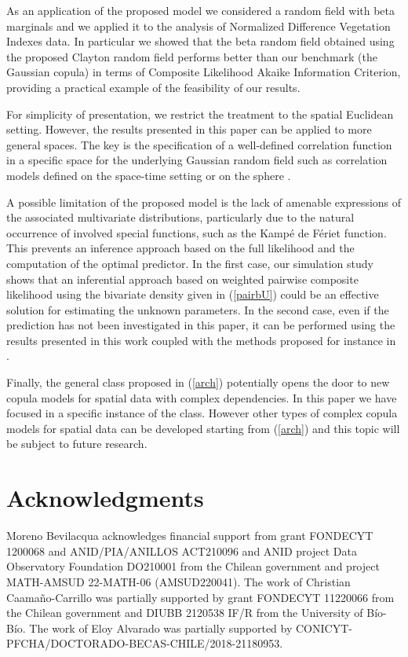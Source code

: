 \documentclass[times,sort&compress,3p]{elsarticle}
\theoremstyle{plain}%
\theoremstyle{definition}
\begin{document}
As an application of the proposed model we considered a random field with beta  marginals
and we applied it to the analysis of  Normalized Difference Vegetation Indexes data.
In  particular we showed that the
beta random field obtained using the proposed
Clayton random field performs better than our benchmark (the Gaussian copula) in terms of Composite Likelihood Akaike Information Criterion, providing a practical example of the feasibility of our results.

For simplicity of presentation, we restrict the treatment to the spatial Euclidean setting.
However, the results presented in this paper can be applied to more general spaces. The key is the specification of a well-defined correlation function in a specific space for the underlying Gaussian random field such as correlation models defined on the space-time setting or on the sphere \citep{gneiting2013,porcubev}.


A possible limitation of the proposed model is the lack of amenable expressions of the associated multivariate distributions, particularly due to the natural occurrence of  involved special functions, such as the Kampé de Fériet function. This prevents an inference approach based on the full likelihood and the computation of the optimal predictor. In the first case, our simulation study shows that an inferential approach based on weighted pairwise composite likelihood using the bivariate density given in (\ref{pairbU}) could be an effective solution for estimating the unknown parameters.
In the second case,
even if the prediction has not been investigated in this paper,
it  can be performed using the results presented in this work coupled with the methods proposed for instance in \cite{Kazianka2010}.

Finally, the general class proposed in  (\ref{arch}) potentially opens the door to
new copula models for spatial data with complex dependencies. In this paper we have focused in a specific instance  of the class. However other types of complex copula models  for spatial data can be developed starting from   (\ref{arch})
and this topic will be subject to future research.








\section*{Acknowledgments}
Moreno Bevilacqua acknowledges financial support from grant FONDECYT 1200068 and ANID/PIA/ANILLOS ACT210096
and  ANID project Data Observatory Foundation DO210001 from the Chilean government
and project MATH-AMSUD 22-MATH-06 (AMSUD220041). The work of Christian Caama\~no-Carrillo was partially supported by grant FONDECYT 11220066 from the Chilean government and DIUBB 2120538 IF/R from the University of B\'io-B\'io.  The work of Eloy Alvarado was partially supported by CONICYT-PFCHA/DOCTORADO-BECAS-CHILE/2018-21180953.
\end{document}
